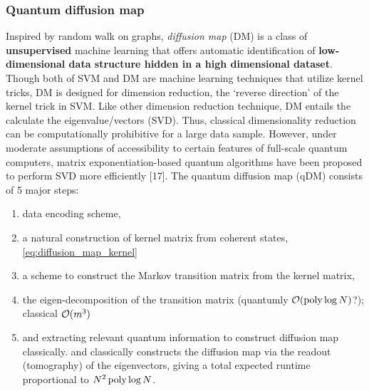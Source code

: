 \subsubsection{Quantum diffusion map}
Inspired by random walk on graphs, \emph{diffusion map} (DM) is a class of \textbf{unsupervised} machine learning that offers automatic identification of \textbf{low-dimensional data structure hidden in a high dimensional dataset}.
Though both of SVM and DM are machine learning techniques that utilize kernel tricks, DM is designed for dimension reduction, the `reverse direction' of the kernel trick in SVM.
Like other dimension reduction technique, DM entails the calculate the eigenvalue/vectors (SVD).
Thus, classical dimensionality reduction can be computationally prohibitive for a large data sample. 
However, under moderate assumptions of accessibility to certain features of full-scale quantum computers, matrix exponentiation-based quantum algorithms have been proposed to perform SVD more efficiently [17]. 
The quantum diffusion map (qDM) consists of 5 major steps: 
\begin{enumerate}
	\item {} data encoding scheme, 
	\item 
	a natural construction of kernel matrix from coherent states, 
	\cref{eq:diffusion_map_kernel}
	\item 
	a scheme to construct the Markov transition matrix from the kernel matrix, 
	\item 
	the eigen-decomposition of the transition matrix (quantumly $\mathcal{O}(\operatorname{\textup{poly}}\log N)$?); classical $\mathcal{O}(m^3)$
	\item 
	and extracting relevant quantum information to construct diffusion map classically. 
	and classically constructs the diffusion map via the readout (tomography) of the eigenvectors, giving a total expected runtime proportional to $N^2 \operatorname{\textup{poly}}\log N$.
\end{enumerate}
